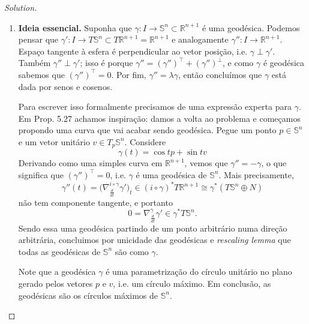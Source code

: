 \begin{proof}[Solution]\leavevmode
\begin{enumerate}[label=(\alph*)]
\item \textbf{Ideia essencial.} Suponha que \(\gamma:I \to \mathbb{S}^n \subset \mathbb{R}^{n+1}\) é uma geodésica. Podemos pensar que \(\gamma':I \to T\mathbb{S}^n \subset T\mathbb{R}^{n+1}=\mathbb{R}^{n+1}\) e analogamente \(\gamma'':I \to \mathbb{R}^{n+1}\). Espaço tangente à esfera é perpendicular ao vetor posição, i.e. \(\gamma \perp \gamma'\). Também \(\gamma'' \perp \gamma'\); isso é porque \(\gamma''=(\gamma'')^{\top}+(\gamma'')^{\perp}\), e como \(\gamma\) é geodésica sabemos que \((\gamma'')^{\top}=0\). Por fim, \(\gamma''=\lambda \gamma\), então concluímos que \(\gamma\) está dada por senos e cosenos.
\vspace{1em}

	Para escrever isso formalmente precisamos de uma expressão experta para \(\gamma\).  Em \cite{ler} Prop. 5.27 achamos inspiração: damos a volta ao problema e começamos propondo uma curva que vai acabar sendo geodésica. Pegue um ponto \(p \in \mathbb{S}^n\) e um vetor unitário \(v \in T_p\mathbb{S}^n\). Considere
	\[\gamma(t)=\cos t p+\sin t v\]
Derivando como uma simples curva em \(\mathbb{R}^{n+1}\), vemos que \(\gamma''=-\gamma\), o que significa que \((\gamma'')^{\top}=0\), i.e. \(\gamma\) é uma geodésica de \(\mathbb{S}^n\). Mais precisamente,
\[\gamma''(t)=\Big(\nabla_{\frac{d}{dt}}^{i \circ \gamma}\gamma'\Big)_t \in (i \circ \gamma)^*T\mathbb{R}^{n+1}\cong \gamma ^* (T\mathbb{S}^n \oplus N)\]
não tem componente tangente, e portanto
 \[0=\nabla_{\frac{d}{dt}}^{\gamma}\gamma' \in \gamma^* T\mathbb{S}^n.\]
Sendo essa uma geodésica partindo de um ponto arbitrário numa direção arbitrária, concluimos por unicidade das geodésicas e \textit{rescaling lemma} que todas as geodésicas de \(\mathbb{S}^n\) são como \(\gamma\).

Note que a geodésica \(\gamma\) é uma parametrização do círculo unitário no plano gerado pelos vetores \(p\) e \(v\), i.e. um círculo máximo. Em conclusão, as geodésicas são os círculos máximos de \(\mathbb{S}^n\).


\end{enumerate}
\end{proof}
